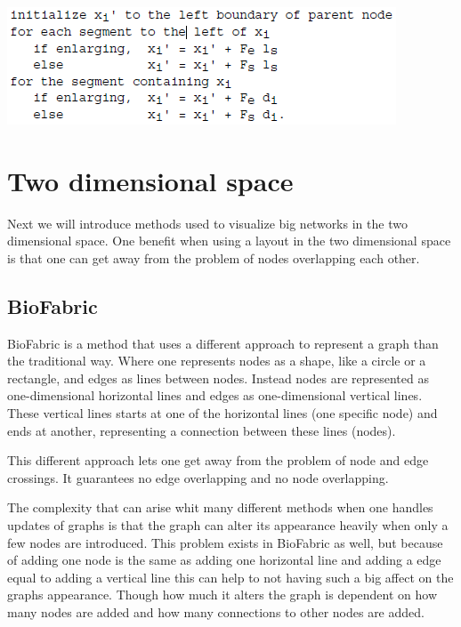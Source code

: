 \documentclass[a4paper,11pt]{kth-mag}
\begin{document}
\includegraphics{FishEye}
\section{Two dimensional space}
Next we will introduce methods used to visualize big networks in the two dimensional space. One benefit when using a layout in 
the two dimensional space is that one can get away from the problem of nodes overlapping each other. 
\subsection{BioFabric}
BioFabric\cite{23102059} is a method that uses a different approach to represent a graph than the traditional way. Where one represents nodes
as a shape, like a circle or a rectangle, and edges as lines between nodes. Instead nodes are represented as one-dimensional
horizontal lines and edges as one-dimensional vertical lines. These vertical lines starts at one of the horizontal lines (one specific node)
and ends at another, representing a connection between these lines (nodes).

This different approach lets one get away from the problem of node and edge crossings. It guarantees no edge overlapping and no node overlapping.

The complexity that can arise whit many different methods when one handles updates of graphs is that the graph can alter its appearance heavily when only a few nodes are introduced. 
This problem exists in BioFabric as well, but because of adding one node is the same as adding one horizontal line and adding a edge equal to adding a vertical line this can 
help to not having such a big affect on the graphs appearance. Though how much it alters the graph is dependent on how many nodes are added and how many connections to other nodes are
added.
\end{document}
